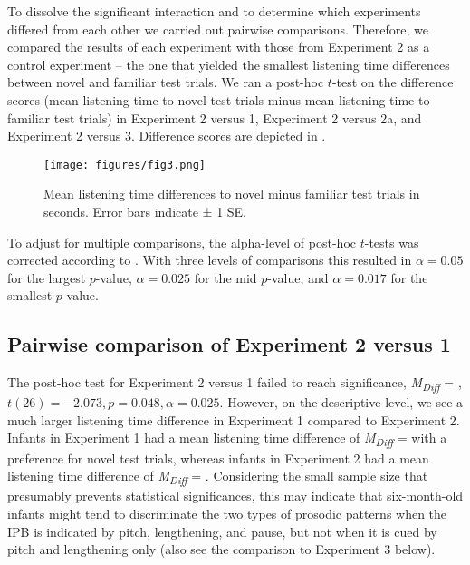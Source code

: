 \documentclass[output=paper]{langscibook}
\begin{document}
To dissolve the significant interaction and to determine which experiments differed from each other we carried out pairwise comparisons. Therefore, we compared the results of each experiment with those from Experiment 2 as a control experiment – the one that yielded the smallest listening time differences between novel and familiar test trials. We ran a post-hoc $t$-test on the difference scores (mean listening time to novel test trials minus mean listening time to familiar test trials) in Experiment 2 versus 1, Experiment 2 versus 2a, and Experiment 2 versus 3. Difference scores are depicted in .

\begin{figure} %
\texttt{[image: figures/fig3.png]}
\caption{Mean listening time differences to novel minus familiar test trials in seconds. Error bars indicate ± 1 SE.}
 \label{fig3}
\end{figure}

To adjust for multiple comparisons, the alpha-level of post-hoc $t$-tests was corrected according to \citet{Holm1979}. With three levels of comparisons this resulted in $\alpha = 0.05$ for the largest $p$-value, $\alpha = 0.025$ for the mid $p$-value, and $\alpha = 0.017$ for the smallest $p$-value.

\subsection{Pairwise comparison of Experiment 2 versus 1}\largerpage
The post-hoc test for Experiment 2 versus 1 failed to reach significance, \textit{M\textsubscript{Diff}} = , $t(26) = -2.073,\allowbreak p=0.048,\allowbreak \alpha = 0.025$. However, on the descriptive level, we see a much larger listening time difference in Experiment 1 compared to Experiment 2. Infants in Experiment 1 had a mean listening time difference of \textit{M\textsubscript{Diff}} =  with a preference for novel test trials, whereas infants in Experiment 2 had a mean listening time difference of \textit{M\textsubscript{Diff}} = . Considering the small sample size that presumably prevents statistical significances, this may indicate that six-month-old infants might tend to discriminate the two types of prosodic patterns when the IPB is indicated by pitch, lengthening, and pause, but not when it is cued by pitch and lengthening only (also see the comparison to Experiment 3 below).
\end{document}

